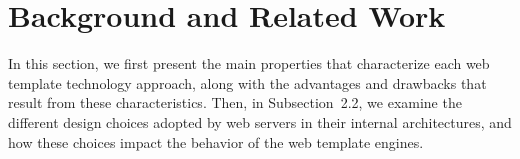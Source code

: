 \section{Background and Related Work}

In this section, we first present the main properties that characterize each web
template technology approach, along with the advantages and drawbacks that result
from these characteristics. Then, in Subsection~2.2, we examine the different
design choices adopted by web servers in their internal architectures, and how
these choices impact the behavior of the web template engines.



